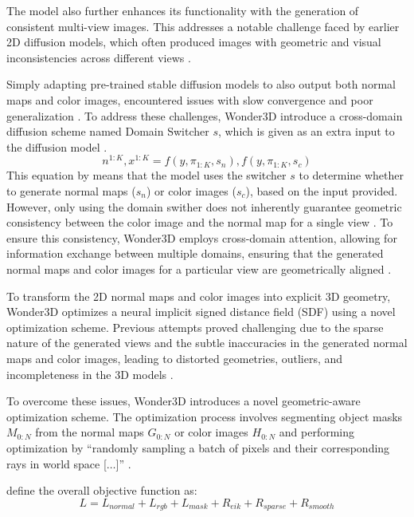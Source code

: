 The model also further enhances its functionality with the generation of consistent multi-view images. This addresses a notable challenge faced by earlier 2D diffusion models, which often produced images with geometric and visual inconsistencies across different views \citep{long2023wonder3d}.

Simply adapting pre-trained stable diffusion models to also output both normal maps and color images, encountered issues with slow convergence and poor generalization \citep{long2023wonder3d}. To address these challenges, Wonder3D introduce a cross-domain diffusion scheme named Domain Switcher \(s\), which is given as an extra input to the diffusion model \citep{long2023wonder3d}. \[
  n^{1:K}, x^{1:K} = f(y, \pi_{1:K}, s_n), f(y, \pi_{1:K}, s_c)
\] This equation by \citeauthor{long2023wonder3d} means that the model uses the switcher \( s \) to determine whether to generate normal maps (\( s_n \)) or color images (\( s_c \)), based on the input provided. However, only using the domain swither does not inherently guarantee geometric consistency between the color image and the normal map for a single view \citep{long2023wonder3d}. To ensure this consistency, Wonder3D employs cross-domain attention, allowing for information exchange between multiple domains, ensuring that the generated normal maps and color images for a particular view are geometrically aligned \citep{long2023wonder3d}.

To transform the 2D normal maps and color images into explicit 3D geometry, Wonder3D optimizes a neural implicit signed distance field (SDF) using a novel optimization scheme. Previous attempts proved challenging due to the sparse nature of the generated views and the subtle inaccuracies in the generated normal maps and color images, leading to distorted geometries, outliers, and incompleteness in the 3D models \citep{long2023wonder3d}.



To overcome these issues, Wonder3D introduces a novel geometric-aware optimization scheme. The optimization process involves segmenting object masks \( M_{0:N} \) from the normal maps \( G_{0:N} \) or color images \( H_{0:N} \) and performing optimization by ``randomly sampling a batch of pixels and their corresponding rays in world space [\(\ldots\)]'' \citep{long2023wonder3d}.

\citeauthor{long2023wonder3d} define the overall objective function as: \[ L = L_{normal} + L_{rgb} + L_{mask} + R_{eik} + R_{sparse} + R_{smooth} \]

